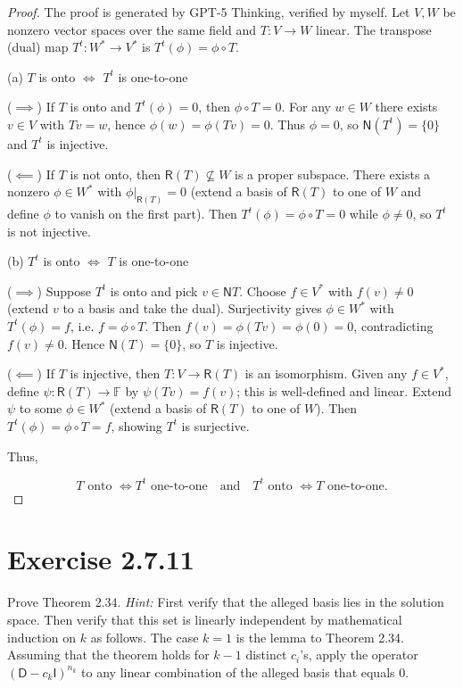 \documentclass{article}
\newcommand{\0}{\mathit{0}}
\begin{document}
\begin{proof}
    The proof is generated by GPT-5 Thinking, verified by myself.
    Let $V,W$ be nonzero vector spaces over the same field and $T:V\to W$ linear.
    The transpose (dual) map $T^{t}:W^{*}\to V^{*}$ is $T^{t}(\phi)=\phi\circ T$.

    (a) $T$ is onto  $\iff$  $T^{t}$ is one-to-one

    ($\implies$) If $T$ is onto and $T^{t}(\phi)=0$, then $\phi\circ T=0$.
    For any $w\in W$ there exists $v\in V$ with $T v=w$, hence
    $\phi(w)=\phi(Tv)=0$. Thus $\phi=0$, so $\mathsf{N}(T^{t})=\{\0\}$ and $T^{t}$ is injective.

    ($\impliedby$) If $T$ is not onto, then $\mathsf{R}(T)\not\subseteq W$ is a proper subspace.
    There exists a nonzero $\phi\in W^{*}$ with $\phi|_{\mathsf{R}(T)}=0$ (extend a basis of $\mathsf{R}(T)$ to one of $W$ and define $\phi$ to vanish on the first part). Then
    $T^{t}(\phi)=\phi\circ T=0$ while $\phi\neq 0$, so $T^{t}$ is not injective.

    (b) $T^{t}$ is onto  $\iff$  $T$ is one-to-one

    ($\implies$) Suppose $T^{t}$ is onto and pick $v\in\mathsf{N}T$.
    Choose $f\in V^{*}$ with $f(v)\neq 0$ (extend $v$ to a basis and take the dual).
    Surjectivity gives $\phi\in W^{*}$ with $T^{t}(\phi)=f$, i.e. $f=\phi\circ T$.
    Then $f(v)=\phi(Tv)=\phi(0)=0$, contradicting $f(v)\neq 0$. Hence $\mathsf{N}(T)=\{0\}$, so $T$ is injective.

    ($\impliedby$) If $T$ is injective, then $T:V\to \mathsf{R}(T)$ is an isomorphism.
    Given any $f\in V^{*}$, define $\psi:\mathsf{R}(T)\to \mathbb{F}$ by $\psi(Tv)=f(v)$; this is well-defined and linear.
    Extend $\psi$ to some $\phi\in W^{*}$ (extend a basis of $\mathsf{R}(T)$ to one of $W$).
    Then $T^{t}(\phi)=\phi\circ T=f$, showing $T^{t}$ is surjective.

    Thus,

    \[
        T\text{ onto } \iff T^{t}\text{ one-to-one}\quad\text{and}\quad T^{t}\text{ onto } \iff T\text{ one-to-one.}
    \]

\end{proof}

\section{Exercise 2.7.11}
Prove Theorem 2.34. \textit{Hint:} First verify that the alleged basis lies in the solution space.
Then verify that this set is linearly independent by mathematical induction on $k$ as follows.
The case $k = 1$ is the lemma to Theorem 2.34. Assuming that the theorem holds for
$k - 1$ distinct $c_i$'s, apply the operator $(\mathsf{D} - c_k \mathsf{I})^{n_k}$ to any linear
combination of the alleged basis that equals $0$.
\end{document}
